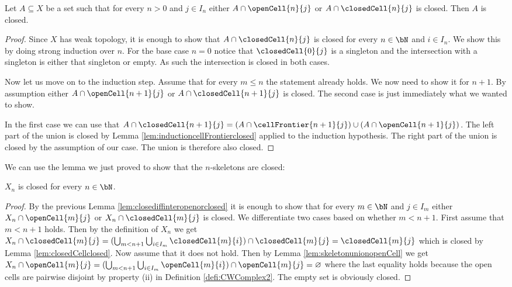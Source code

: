 \begin{lem}\label{lem:closediffinteropenorclosed}
    Let $A \subseteq X$ be a set such that for every $n > 0$ and $j \in I_n$ either $A \cap \openCell{n}{j}$ or $A \cap \closedCell{n}{j}$ is closed.
    Then $A$ is closed.
\end{lem}
\begin{proof}
    Since $X$ has weak topology, it is enough to show that $A \cap \closedCell{n}{j}$ is closed for every $n \in \bN$ and $i \in I_n$.
    We show this by doing strong induction over $n$.
    For the base case $n = 0$ notice that $\closedCell{0}{j}$ is a singleton and the intersection with a singleton is either that singleton or empty.
    As such the intersection is closed in both cases.

    Now let us move on to the induction step.
    Assume that for every $m \le n$ the statement already holds.
    We now need to show it for $n + 1$.
    By assumption either $A \cap \openCell{n + 1}{j}$ or $A \cap \closedCell{n + 1}{j}$ is closed. The second case is just immediately what we wanted to show.

    In the first case we can use that $A \cap \closedCell{n + 1}{j} = (A \cap \cellFrontier{n + 1}{j}) \cup (A \cap \openCell{n + 1}{j})$.
    The left part of the union is closed by Lemma \ref{lem:inductioncellFrontierclosed} applied to the induction hypothesis.
    The right part of the union is closed by the assumption of our case.
    The union is therefore also closed.
\end{proof}

We can use the lemma we just proved to show that the $n$-skeletons are closed:

\begin{lem}\label{lem:levelclosed}
    $X_n$ is closed for every $n \in \bN$.
\end{lem}
\begin{proof}
    By the previous Lemma \ref{lem:closediffinteropenorclosed} it is enough to show that for every $m \in \bN$ and $j \in I_m$ either $X_n \cap \openCell{m}{j}$ or $X_n \cap \closedCell{m}{j}$ is closed.
    We differentiate two cases based on whether $m < n + 1$.
    First assume that $m < n + 1$ holds.
    Then by the definition of $X_n$ we get $X_n \cap \closedCell{m}{j} = (\bigcup_{m < n + 1} \bigcup_{i \in I_m} \closedCell{m}{i}) \cap \closedCell{m}{j} = \closedCell{m}{j}$ which is closed by Lemma \ref{lem:closedCellclosed}.
    Now assume that it does not hold.
    Then by Lemma \ref{lem:skeletonunionopenCell} we get $X_n \cap \openCell{m}{j} = (\bigcup_{m < n + 1} \bigcup_{i \in I_m} \openCell{m}{i}) \cap \openCell{m}{j} = \varnothing$ where the last equality holds because the open cells are pairwise disjoint by property (ii) in Definition \ref{defi:CWComplex2}.
    The empty set is obviously closed.
\end{proof}

